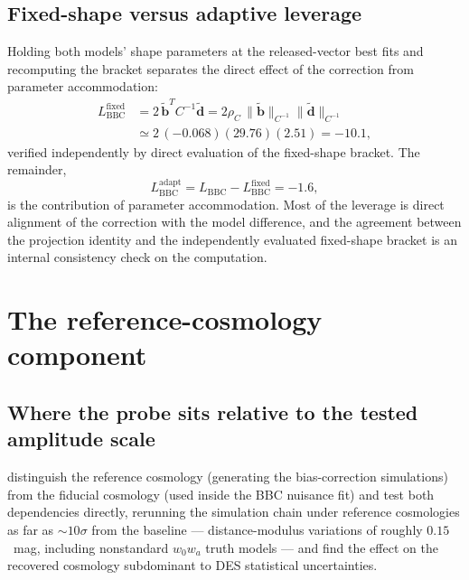 \documentclass[11pt]{article}
\begin{document}
\subsection{Fixed-shape versus adaptive leverage}
\label{sec:fixed}

Holding both models' shape parameters at the released-vector best fits and
recomputing the bracket separates the direct effect of the correction from
parameter accommodation:
\begin{align}
L_{\mathrm{BBC}}^{\mathrm{fixed}}
&= 2\,\widetilde{\boldsymbol b}^{T} C^{-1} \widetilde{\boldsymbol d}
 = 2\rho_C\,
   \lVert\widetilde{\boldsymbol b}\rVert_{C^{-1}}
   \lVert\widetilde{\boldsymbol d}\rVert_{C^{-1}}
 \nonumber\\
&\simeq 2\,(-0.068)(29.76)(2.51) = -10.1 ,
\label{eq:fixed}
\end{align}
verified independently by direct evaluation of the fixed-shape bracket.
The remainder,
\begin{equation}
L_{\mathrm{BBC}}^{\mathrm{adapt}}
= L_{\mathrm{BBC}} - L_{\mathrm{BBC}}^{\mathrm{fixed}}
= -1.6 ,
\label{eq:adapt}
\end{equation}
is the contribution of parameter accommodation. Most of the leverage is
direct alignment of the correction with the model difference, and the
agreement between the projection identity and the independently evaluated
fixed-shape bracket is an internal consistency check on the computation.

\section{The reference-cosmology component}
\label{sec:isolate}

\subsection{Where the probe sits relative to the tested amplitude scale}
\label{sec:envelope}

\citet{Camilleri2024} distinguish the reference cosmology (generating the
bias-correction simulations) from the fiducial cosmology (used inside the
BBC nuisance fit) and test both dependencies directly, rerunning the
simulation chain under reference cosmologies as far as $\sim 10\sigma$
from the baseline --- distance-modulus variations of roughly $0.15$~mag,
including nonstandard $w_0 w_a$ truth models --- and find the effect on
the recovered cosmology subdominant to DES statistical uncertainties.
\end{document}
